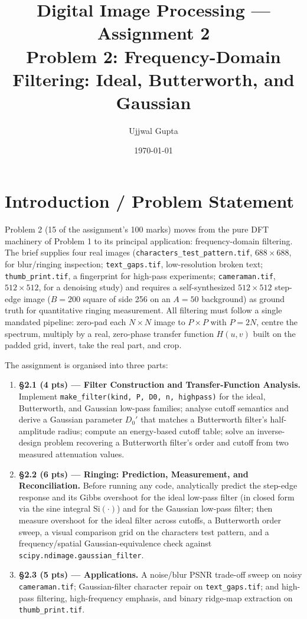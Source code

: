 \documentclass[11pt]{article}
\title{\textbf{Digital Image Processing --- Assignment 2}\\[0.3em]\large Problem 2: Frequency-Domain Filtering: Ideal, Butterworth, and Gaussian}
\author{Ujjwal Gupta}
\date{\today}
\begin{document}
\maketitle
\tableofcontents
\vspace{1em}

\section{Introduction / Problem Statement}

Problem 2 (15 of the assignment's 100 marks) moves from the pure DFT machinery of Problem 1 to
its principal application: frequency-domain filtering. The brief supplies four real images
(\texttt{characters\_test\_pattern.tif}, $688\times688$, for blur/ringing inspection;
\texttt{text\_gaps.tif}, low-resolution broken text; \texttt{thumb\_print.tif}, a fingerprint for
high-pass experiments; \texttt{cameraman.tif}, $512\times512$, for a denoising study) and requires
a self-synthesized $512\times512$ step-edge image ($B=200$ square of side 256 on an $A=50$
background) as ground truth for quantitative ringing measurement. All filtering must follow a
single mandated pipeline: zero-pad each $N\times N$ image to $P\times P$ with $P=2N$, centre the
spectrum, multiply by a real, zero-phase transfer function $H(u,v)$ built on the padded grid,
invert, take the real part, and crop.

The assignment is organised into three parts:
\begin{enumerate}[label=(\arabic*)]
  \item \textbf{\S2.1 (4 pts) --- Filter Construction and Transfer-Function Analysis.}
    Implement \texttt{make\_filter(kind, P, D0, n, highpass)} for the ideal, Butterworth, and
    Gaussian low-pass families; analyse cutoff semantics and derive a Gaussian parameter $D_0'$ that
    matches a Butterworth filter's half-amplitude radius; compute an energy-based cutoff table;
    solve an inverse-design problem recovering a Butterworth filter's order and cutoff from two
    measured attenuation values.
  \item \textbf{\S2.2 (6 pts) --- Ringing: Prediction, Measurement, and Reconciliation.}
    Before running any code, analytically predict the step-edge response and its Gibbs overshoot
    for the ideal low-pass filter (in closed form via the sine integral $\mathrm{Si}(\cdot)$) and
    for the Gaussian low-pass filter; then measure overshoot for the ideal filter across cutoffs, a
    Butterworth order sweep, a visual comparison grid on the characters test pattern, and a
    frequency/spatial Gaussian-equivalence check against \texttt{scipy.ndimage.gaussian\_filter}.
  \item \textbf{\S2.3 (5 pts) --- Applications.} A noise/blur PSNR trade-off sweep on noisy
    \texttt{cameraman.tif}; Gaussian-filter character repair on \texttt{text\_gaps.tif}; and
    high-pass filtering, high-frequency emphasis, and binary ridge-map extraction on
    \texttt{thumb\_print.tif}.
\end{enumerate}
\end{document}
